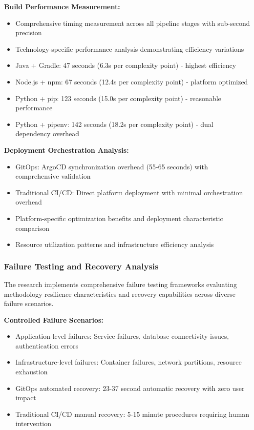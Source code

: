 \textbf{Build Performance Measurement:}
\begin{itemize}
\item Comprehensive timing measurement across all pipeline stages with sub-second precision
\item Technology-specific performance analysis demonstrating efficiency variations
\item Java + Gradle: 47 seconds (6.3s per complexity point) - highest efficiency
\item Node.js + npm: 67 seconds (12.4s per complexity point) - platform optimized
\item Python + pip: 123 seconds (15.0s per complexity point) - reasonable performance
\item Python + pipenv: 142 seconds (18.2s per complexity point) - dual dependency overhead
\end{itemize}

\textbf{Deployment Orchestration Analysis:}
\begin{itemize}
\item GitOps: ArgoCD synchronization overhead (55-65 seconds) with comprehensive validation
\item Traditional CI/CD: Direct platform deployment with minimal orchestration overhead
\item Platform-specific optimization benefits and deployment characteristic comparison
\item Resource utilization patterns and infrastructure efficiency analysis
\end{itemize}

\subsubsection{Failure Testing and Recovery Analysis}

The research implements comprehensive failure testing frameworks evaluating methodology resilience characteristics and recovery capabilities across diverse failure scenarios.

\textbf{Controlled Failure Scenarios:}
\begin{itemize}
\item Application-level failures: Service failures, database connectivity issues, authentication errors
\item Infrastructure-level failures: Container failures, network partitions, resource exhaustion
\item GitOps automated recovery: 23-37 second automatic recovery with zero user impact
\item Traditional CI/CD manual recovery: 5-15 minute procedures requiring human intervention
\end{itemize}

